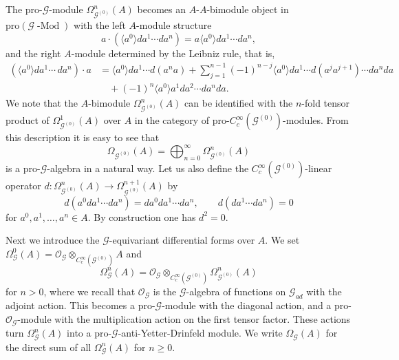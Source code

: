 \documentclass{amsart}
\newcommand{\G}{\mathcal{G}}
\newcommand{\OG}{\mathcal{O}_{\mathcal{G}}}
\newcommand{\ccinfty}{C_c^\infty}
\newcommand{\pro}{\mathrm{pro}}
\begin{document}
The pro-$ \G $-module $ \Omega^n_{\G^{(0)}}(A) $ becomes an $ A $-$ A $-bimodule object in $ \pro(\G \operatorname{-Mod}) $ with the left $ A $-module structure 
$$
a \cdot (\langle a^0 \rangle da^1 \cdots da^n) = a\langle a^0 \rangle da^1 \cdots da^n, 
$$ 
and the right $ A $-module determined by the Leibniz rule, that is, 
\begin{align*}
(\langle a^0 \rangle da^1\cdots \, da^n)\cdot a &= \langle a^0 \rangle da^1 \cdots d(a^na) + \sum_{j = 1}^{n - 1}(-1)^{n - j} \langle a^0 \rangle da^1\cdots d(a^ja^{j + 1}) \cdots da^n da \\
&\quad +(-1)^{n} \langle a^0 \rangle a^1da^2\cdots da^nda. 
\end{align*}
We note that the $ A $-bimodule $ \Omega^n_{\G^{(0)}}(A) $ can be identified with the $ n $-fold tensor product of $ \Omega^1_{\G^{(0)}}(A) $ over $ A $ in the category of pro-$ \ccinfty(\G^{(0)}) $-modules. From this description it is easy to see that 
$$
\Omega_{\G^{(0)}}(A) = \bigoplus_{n = 0}^\infty \Omega^n_{\G^{(0)}}(A)
$$
is a pro-$ \G $-algebra in a natural way. 
Let us also define the $ \ccinfty(\G^{(0)}) $-linear operator $ d: \Omega^n_{\G^{(0)}}(A) \rightarrow \Omega^{n+1}_{\G^{(0)}}(A)$ by
$$
d(a^0da^1 \cdots da^n) = da^0 da^1 \cdots da^n, \qquad d(da^1\cdots da^n)=0
$$ 
for $ a^0, a^1, \dots, a^n \in A $. By construction one has $ d^2 = 0 $. 

Next we introduce the $ \G $-equivariant differential forms over $ A $. We set $ \Omega^0_\G(A) = \OG \otimes_{\ccinfty(\G^{(0)})} A $ and 
$$
\Omega^n_\G(A) = \OG \otimes_{\ccinfty(\G^{(0)})} \Omega^n_{\G^{(0)}}(A)
$$ 
for $ n > 0 $, where we recall that $ \OG $ is the $ \G $-algebra of functions on $ \G_{ad} $ with the adjoint action. This becomes a pro-$ \G $-module with the diagonal action, and a pro-$ \OG $-module with the multiplication action on the first tensor factor. These actions turn $ \Omega^n_\G(A) $ into a pro-$ \G $-anti-Yetter-Drinfeld module. We write $ \Omega_\G(A) $ for the direct sum of all $ \Omega^n_\G(A) $ for $ n \geq 0 $. 
\end{document}
